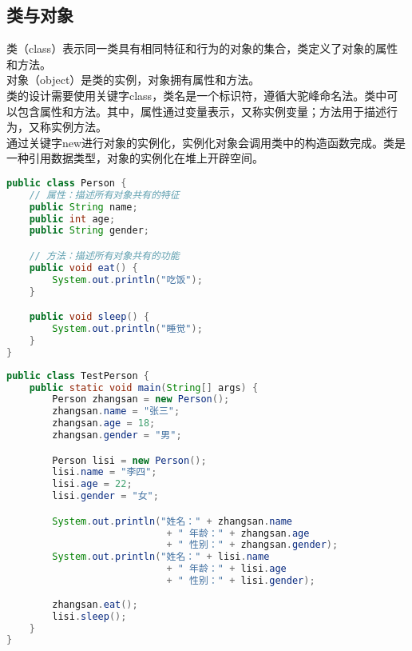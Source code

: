 \subsection{类与对象}

类（class）表示同一类具有相同特征和行为的对象的集合，类定义了对象的属性和方法。 \\

对象（object）是类的实例，对象拥有属性和方法。 \\

类的设计需要使用关键字class，类名是一个标识符，遵循大驼峰命名法。类中可以包含属性和方法。其中，属性通过变量表示，又称实例变量；方法用于描述行为，又称实例方法。 \\

通过关键字new进行对象的实例化，实例化对象会调用类中的构造函数完成。类是一种引用数据类型，对象的实例化在堆上开辟空间。 \\


\begin{lstlisting}[language=Java, title=Person.java]
public class Person {
    // 属性：描述所有对象共有的特征
    public String name;
    public int age;
    public String gender;

    // 方法：描述所有对象共有的功能
    public void eat() {
        System.out.println("吃饭");
    }

    public void sleep() {
        System.out.println("睡觉");
    }
}
\end{lstlisting}

\begin{lstlisting}[language=Java, title=TestPerson.java]
public class TestPerson {
    public static void main(String[] args) {
        Person zhangsan = new Person();
        zhangsan.name = "张三";
        zhangsan.age = 18;
        zhangsan.gender = "男";

        Person lisi = new Person();
        lisi.name = "李四";
        lisi.age = 22;
        lisi.gender = "女";

        System.out.println("姓名：" + zhangsan.name 
                            + " 年龄：" + zhangsan.age
                            + " 性别：" + zhangsan.gender);
        System.out.println("姓名：" + lisi.name 
                            + " 年龄：" + lisi.age
                            + " 性别：" + lisi.gender);
        
        zhangsan.eat();
        lisi.sleep();
    }
}
\end{lstlisting}


